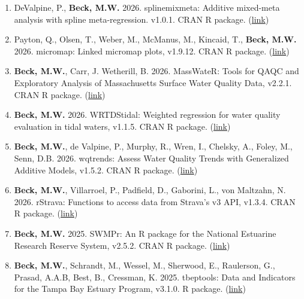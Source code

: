 \documentclass[letterpaper,12pt]{article}
\begin{document}
\begin{enumerate}

\item DeValpine, P., \textbf{Beck, M.W.} 2026. splinemixmeta: Additive mixed-meta analysis with spline meta-regression. v1.0.1. CRAN R package. ({\footnotesize\href{https://cran.r-project.org/web/packages/splinemixmeta/index.html}{link}})
    
\item Payton, Q., Olsen, T., Weber, M., McManus, M., Kincaid, T., \textbf{Beck, M.W.} 2026. micromap: Linked micromap plots, v1.9.12. CRAN R package. ({\footnotesize\href{https://cran.r-project.org/web/packages/micromap/index.html}{link}})
    
\item \textbf{Beck, M.W.}, Carr, J. Wetherill, B. 2026. MassWateR: Tools for QAQC and Exploratory Analysis of Massachusetts Surface Water Quality Data, v2.2.1. CRAN R package. ({\footnotesize\href{https://massbays-tech.github.io/MassWateR/}{link}})
    
\item \textbf{Beck, M.W.} 2026. WRTDStidal: Weighted regression for water quality evaluation in tidal waters, v1.1.5. CRAN R package. ({\footnotesize\href{https://cran.r-project.org/web/packages/WRTDStidal/index.html}{link}})
 
\item \textbf{Beck, M.W.}, de Valpine, P., Murphy, R., Wren, I., Chelsky, A., Foley, M., Senn, D.B. 2026. wqtrends: Assess Water Quality Trends with Generalized Additive Models, v1.5.2. CRAN R package. ({\footnotesize\href{https://tbep-tech.github.io/wqtrends/}{link}})

\item \textbf{Beck, M.W.}, Villarroel, P., Padfield, D., Gaborini, L., von Maltzahn, N. 2026. rStrava: Functions to access data from Strava's v3 API, v1.3.4. CRAN R package. ({\footnotesize\href{https://cran.r-project.org/web/packages/rStrava/index.html}{link}})

\item \textbf{Beck, M.W.} 2025. SWMPr: An R package for the National Estuarine Research Reserve System, v2.5.2. CRAN R package. ({\footnotesize\href{http://fawda123.github.io/SWMPr}{link}})

\item \textbf{Beck, M.W.}, Schrandt, M., Wessel, M., Sherwood, E., Raulerson, G., Prasad, A.A.B, Best, B., Cressman, K. 2025. tbeptools: Data and Indicators for the Tampa Bay Estuary Program, v3.1.0. R package. ({\footnotesize\href{https://tbep-tech.github.io/tbeptools/}{link}})


\end{enumerate}
\end{document}
